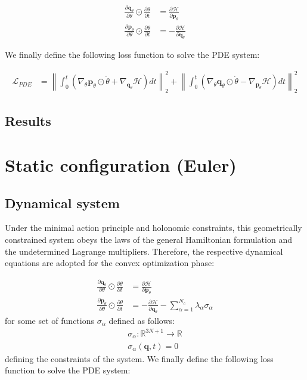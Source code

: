 \documentclass[draft]{agujournal2019}
\newcommand{\norm}[1]{\left\lVert#1\right\rVert}
\begin{document}
\begin{align}
    \frac{\partial \mathbf{q}_\theta}{\partial \theta} \odot \frac{\partial \theta}{\partial t} &= \frac{\partial \mathcal{H}}{\partial \mathbf{p}_\theta} \\
    \frac{\partial \mathbf{p}_\theta}{\partial \theta} \odot \frac{\partial \theta}{\partial t} &= - \frac{\partial \mathcal{H}}{\partial \mathbf{q}_\theta}
\end{align}

We finally define the following loss function to solve the PDE system:

\begin{align}
    \mathcal{L}_{PDE} &= \norm{\int_0^t \left(\nabla_\theta \mathbf{p}_\theta \odot \dot{\theta} + \nabla_{\mathbf{q}_\theta} \mathcal{H}\right) dt}_2^2 + \norm{\int_0^t \left(\nabla_\theta \mathbf{q}_\theta \odot \dot{\theta} - \nabla_{\mathbf{p}_\theta} \mathcal{H}\right) dt}^2_2
\end{align}

\subsection{Results}

\section{Static configuration (Euler)}
\subsection{Dynamical system}
Under the minimal action principle and holonomic constraints, this geometrically constrained system obeys the laws of the general Hamiltonian formulation and the undetermined Lagrange multipliers. Therefore, the respective dynamical equations are adopted for the convex optimization phase:

\begin{align}
    \frac{\partial \mathbf{q}_\theta}{\partial \theta} \odot \frac{\partial \theta}{\partial t} &= \frac{\partial \mathcal{H}}{\partial \mathbf{p}_\theta} \\
    \frac{\partial \mathbf{p}_\theta}{\partial \theta} \odot \frac{\partial \theta}{\partial t} &= - \frac{\partial \mathcal{H}}{\partial \mathbf{q}_\theta} - \sum_{\alpha = 1}^{N_c} \lambda_\alpha \sigma_\alpha
\end{align}
for some set of functions $\sigma_\alpha$ defined as follows:
\begin{align*}
    \sigma_\alpha \colon \mathbb{R}^{3N + 1} \to \mathbb{R} \\
    \sigma_\alpha \left( \mathbf{q}, t \right) = 0
\end{align*}
defining the constraints of the system.
We finally define the following loss function to solve the PDE system:
\end{document}
